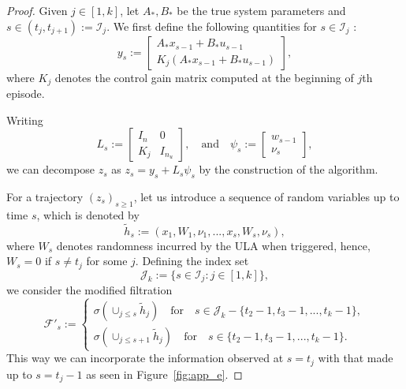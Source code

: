 \documentclass[11pt]{article}
\theoremstyle{plain}
\theoremstyle{definition}
\theoremstyle{remark}
\begin{document}
\begin{proof}
Given $ j \in [1,k]$, let $A_*, B_*$ be the true system parameters and $s \in (t_j,t_{j+1}):=\mathcal{I}_j$. We first define the following quantities for $s\in \mathcal{I}_j$ :
\[
y_s := 
\begin{bmatrix}
    A_*x_{s-1} + B_*u_{s-1}          \\
    K_j(A_*x_{s-1} + B_*u_{s-1})
\end{bmatrix}, 
\]
where $K_j$ denotes the control gain matrix computed at the beginning of $j$th episode.

Writing
\[
L_s := 
\begin{bmatrix}
    I_n & 0\\
    K_j & I_{n_u}
\end{bmatrix},
\quad\text{and}\quad \psi_s :=
\begin{bmatrix}
    w_{s-1}\\
    \nu_{s}
\end{bmatrix},
\]
we can decompose $z_s$ as $z_s= y_s + L_s\psi_s$ by the construction of the algorithm.

For a trajectory $(z_s)_{s\geq 1}$, let us introduce a sequence of random variables up to time $s$, which is denoted by
\[
\tilde h_s:=(x_1,W_1,\nu_1,...,x_{s},W_s,\nu_s),
\]
where $W_s$ denotes randomness incurred by the ULA when triggered, hence, $W_s=0$ if $s \neq t_j$ for some $j$.
Defining the index set 
\[
\mathcal{J}_k:=\{s \in \mathcal{I}_j: j \in[1,k]\},
\]
we consider the modified filtration 
\begin{equation*}
\mathcal{F}'_s:=
\begin{cases}
\sigma(\cup_{j \leq s} \tilde h_j) \quad\text{for}\quad s \in \mathcal{J}_k-\{t_2-1,t_3-1,...,t_k-1\},\\
\sigma(\cup_{j \leq s+1} \tilde h_j) \quad\text{for}\quad s\in \{t_2-1,t_3-1,...,t_k-1\}.
\end{cases}
\end{equation*}
This way we can incorporate the information observed at $s=t_j$ with that made up to $s=t_j-1$ as seen in Figure~\ref{fig:app_e}.




\end{proof}
\end{document}

